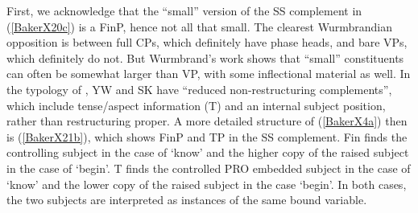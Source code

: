 \documentclass[output=paper,colorlinks,citecolor=brown,
]{langscibook}
\begin{document}
First, we acknowledge that the “small” version of the SS complement in (\ref{BakerX20c}) is a FinP, hence not all that small. The clearest Wurmbrandian opposition is between full CPs, which definitely have phase heads, and bare VPs, which definitely do not. But Wurmbrand’s work shows that “small” constituents can often be somewhat larger than VP, with some inflectional material as well. In the typology of \citet{wurmbrand2001infinitives}, YW and SK have “reduced non-restructuring complements”, which include tense/aspect information (T) and an internal subject position, rather than restructuring proper. A more detailed structure of (\ref{BakerX4a}) then is (\ref{BakerX21b}), which shows FinP and TP in the SS complement. Fin finds the controlling subject in the case of `know’ and the higher copy of the raised subject in the case of `begin’. T finds the controlled PRO embedded subject in the case of `know’ and the lower copy of the raised subject in the case `begin’. In both cases, the two subjects are interpreted as instances of the same bound variable.
\end{document}
